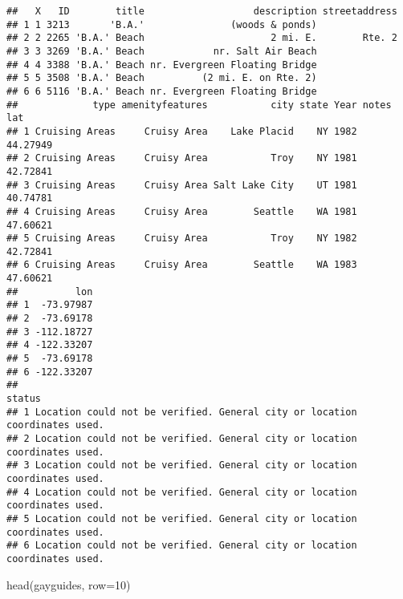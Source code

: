 \documentclass[
]{article}
\newenvironment{Shaded}{\begin{snugshade}}{\end{snugshade}}
\newcommand{\AttributeTok}[1]{\textcolor[rgb]{0.77,0.63,0.00}{#1}}
\newcommand{\DecValTok}[1]{\textcolor[rgb]{0.00,0.00,0.81}{#1}}
\newcommand{\FunctionTok}[1]{\textcolor[rgb]{0.00,0.00,0.00}{#1}}
\newcommand{\NormalTok}[1]{#1}
\begin{document}
\begin{verbatim}
##   X   ID        title                   description streetaddress
## 1 1 3213       'B.A.'               (woods & ponds)              
## 2 2 2265 'B.A.' Beach                      2 mi. E.        Rte. 2
## 3 3 3269 'B.A.' Beach            nr. Salt Air Beach              
## 4 4 3388 'B.A.' Beach nr. Evergreen Floating Bridge              
## 5 5 3508 'B.A.' Beach          (2 mi. E. on Rte. 2)              
## 6 6 5116 'B.A.' Beach nr. Evergreen Floating Bridge              
##             type amenityfeatures           city state Year notes      lat
## 1 Cruising Areas     Cruisy Area    Lake Placid    NY 1982       44.27949
## 2 Cruising Areas     Cruisy Area           Troy    NY 1981       42.72841
## 3 Cruising Areas     Cruisy Area Salt Lake City    UT 1981       40.74781
## 4 Cruising Areas     Cruisy Area        Seattle    WA 1981       47.60621
## 5 Cruising Areas     Cruisy Area           Troy    NY 1982       42.72841
## 6 Cruising Areas     Cruisy Area        Seattle    WA 1983       47.60621
##          lon
## 1  -73.97987
## 2  -73.69178
## 3 -112.18727
## 4 -122.33207
## 5  -73.69178
## 6 -122.33207
##                                                                       status
## 1 Location could not be verified. General city or location coordinates used.
## 2 Location could not be verified. General city or location coordinates used.
## 3 Location could not be verified. General city or location coordinates used.
## 4 Location could not be verified. General city or location coordinates used.
## 5 Location could not be verified. General city or location coordinates used.
## 6 Location could not be verified. General city or location coordinates used.
\end{verbatim}

\begin{Shaded}
\begin{Highlighting}[]
\FunctionTok{head}\NormalTok{(gayguides, }\AttributeTok{row=}\DecValTok{10}\NormalTok{)}
\end{Highlighting}
\end{Shaded}
\end{document}
